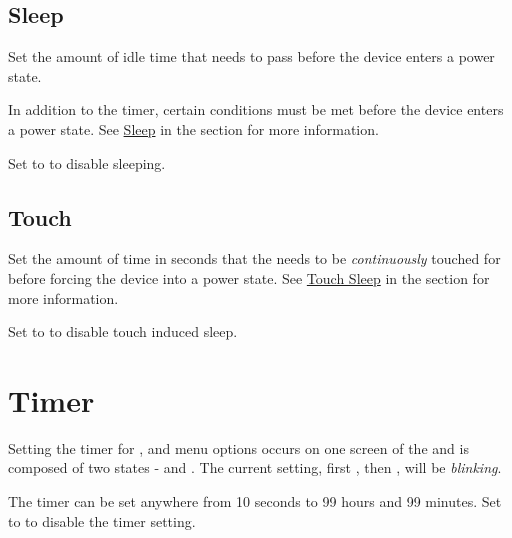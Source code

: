 \subsection{Sleep} 

Set the amount of idle time that needs to pass before the device enters a
 power state.

\par\medskip

In addition to the timer, certain conditions must be met before the device
enters a  power state.  See \hyperref[Power - Sleep]{Sleep} in the
\hyperref[Power]{} section for more information.

\par\medskip

Set to  to disable sleeping.

\subsection{Touch} \label{Power Settings - Touch} 

Set the amount of time in seconds that the  needs to be
\textit{continuously} touched for before forcing the device into a 
power state.  See \hyperref[Power - Touch]{Touch Sleep} in the
\hyperref[Power]{} section for more information.

\par\medskip

Set to  to disable touch induced sleep.

\section{Timer}

Setting the timer for ,  and  menu options occurs on
one screen of the  and is composed of two states -  and
. The current setting, first , then , will be
\textit{blinking}.

\par\medskip

The timer can be set anywhere from \num{10} seconds to \num{99} hours and
\num{99} minutes.  Set to  to disable the timer setting.

